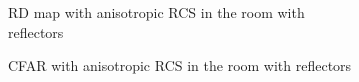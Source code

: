 \documentclass[12pt,DIV14,BCOR12mm,a4paper,footinclude=false,headinclude,parskip=half-,twoside,openright,cleardoublepage=empty,toc=index,bibliography=totoc,listof=totoc]{scrreprt}
\numberwithin{equation}{chapter}
\begin{document}
\begin{figure}[t]
        \begin{subfigure}{0.45\textwidth}
            \centering
            \caption{RD map with anisotropic RCS in the room with reflectors}
        \end{subfigure}\hspace{0.5cm}
        \begin{subfigure}{0.45\textwidth}
            \centering
            \caption{CFAR with anisotropic RCS in the room with reflectors}
        \end{subfigure}
        \begin{subfigure}{0.45\textwidth}

\end{subfigure}
\end{figure}
\end{document}
